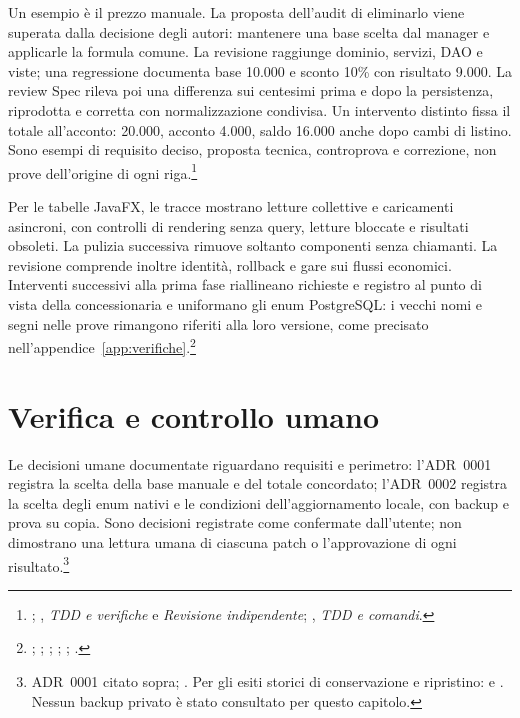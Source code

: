 Un esempio è il prezzo manuale. La proposta dell'audit di eliminarlo viene
superata dalla decisione degli autori: mantenere una base scelta dal manager
e applicarle la formula comune. La revisione raggiunge dominio, servizi,
DAO e viste; una regressione documenta base 10.000 e sconto 10\% con risultato
9.000. La review Spec rileva poi una differenza sui centesimi prima e dopo
la persistenza, riprodotta e corretta con normalizzazione condivisa.
Un intervento distinto fissa il totale all'acconto: 20.000, acconto 4.000,
saldo 16.000 anche dopo cambi di listino. Sono esempi di requisito deciso,
proposta tecnica, controprova e correzione, non prove dell'origine di ogni
riga.\footnote{\raggedright {};
, \emph{TDD e verifiche}
e \emph{Revisione indipendente};
, \emph{TDD e comandi}.}

Per le tabelle JavaFX, le tracce mostrano letture collettive e caricamenti
asincroni, con controlli di rendering senza query, letture bloccate e risultati
obsoleti. La pulizia successiva rimuove soltanto componenti senza chiamanti.
La revisione comprende inoltre identità, rollback e gare sui flussi economici.
Interventi successivi alla prima fase riallineano richieste e registro al
punto di vista della concessionaria e uniformano gli enum PostgreSQL:
i vecchi nomi e segni nelle prove rimangono riferiti alla loro versione,
come precisato nell'appendice~\ref{app:verifiche}.\footnote{\raggedright 
{};
;
;
;
;
.}

\section{Verifica e controllo umano}
Le decisioni umane documentate riguardano requisiti e perimetro: l'ADR~0001
registra la scelta della base manuale e del totale concordato; l'ADR~0002
registra la scelta degli enum nativi e le condizioni dell'aggiornamento
locale, con backup e prova su copia. Sono decisioni registrate come
confermate dall'utente; non dimostrano una lettura umana di ciascuna patch
o l'approvazione di ogni risultato.\footnote{\raggedright ADR~0001 citato sopra;
.
Per gli esiti storici di conservazione e ripristino:
e .
Nessun backup privato è stato consultato per questo capitolo.}

